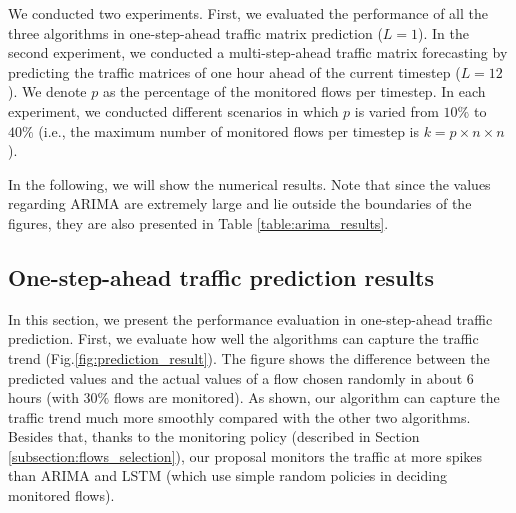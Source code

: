We conducted two experiments. First, we evaluated the performance of all the three algorithms in one-step-ahead traffic matrix prediction ($L=1$). In the second experiment, we conducted a multi-step-ahead traffic matrix forecasting by predicting the traffic matrices of one hour ahead of the current timestep ($L = 12$). We denote $p$ as the percentage of the monitored flows per timestep. In each experiment, we conducted different scenarios in which $p$ is varied from $10\%$ to $40\%$ (i.e., the maximum number of monitored flows per timestep is $k = p \times n \times n$). 

In the following, we will show the numerical results.
Note that since the values regarding ARIMA are extremely large and lie outside the boundaries of the figures, they are also presented in Table \ref{table:arima_results}. 
\subsection{One-step-ahead traffic prediction results}
In this section, we present the performance evaluation in one-step-ahead traffic prediction.
First, we evaluate how well the algorithms can capture the traffic trend (Fig.\ref{fig:prediction_result}). 
The figure shows the difference between the predicted values and the actual values of a flow chosen randomly in about 6 hours (with 30$\%$ flows are monitored). As shown, our algorithm can capture the traffic trend much more smoothly compared with the other two algorithms. 
Besides that, thanks to the monitoring policy (described in Section \ref{subsection:flows_selection}), our proposal monitors the traffic at more spikes than ARIMA and LSTM (which use simple random policies in deciding monitored flows). 

